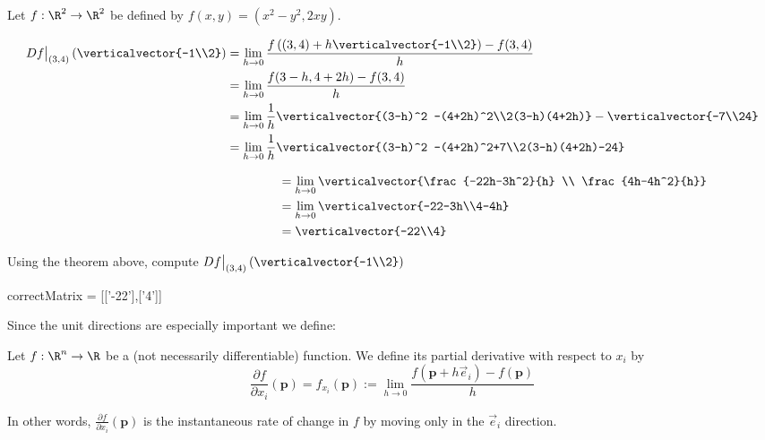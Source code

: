 \documentclass{ximera}
\begin{document}
	\begin{question}
		Let $f:\R^2 \to \R^2$ be defined by $f(x,y)=(x^2-y^2,2xy)$.
			\begin{solution}
				\begin{hint}
					\begin{align*}
						  Df\big|_{(3,4)}\left(\verticalvector{-1\\2}\right) &= \lim_{h \to 0} \frac{f\left((3,4)+h\verticalvector{-1\\2}\right) - f(3,4)}{h}\\
						  &= \lim_{h \to 0} \frac{f(3-h,4+2h)-f(3,4)}{h}\\
						  &= \lim_{h \to 0}\frac{1}{h}  \verticalvector{(3-h)^2 -(4+2h)^2\\2(3-h)(4+2h)} - \verticalvector{-7\\24} \\
						  &=\lim_{h \to 0}\frac{1}{h} \verticalvector{(3-h)^2 -(4+2h)^2+7\\2(3-h)(4+2h)-24}
					\end{align*}
				\end{hint}
				\begin{hint}
					\begin{align*}
						 \hphantom{Df\big|_{(3,4)}\left(\verticalvector{-1\\2}\right) }&=\lim_{h \to 0}\verticalvector{\frac{-22h-3h^2}{h} \\ \frac{4h-4h^2}{h}}\\
						&=\lim_{h \to 0}\verticalvector{-22-3h\\4-4h}\\
						&=\verticalvector{-22\\4}
					\end{align*}
				\end{hint}
				Using the theorem above, compute $Df\big|_{(3,4)}\left(\verticalvector{-1\\2}\right)$
				\begin{matrix-answer}
					correctMatrix = [['-22'],['4']]
				\end{matrix-answer}
			\end{solution}
	\end{question}

	Since the unit directions are especially important we define:
	
	\begin{definition}
		Let $f: \R^n \to \R$ be a (not necessarily differentiable) function.  We define its partial derivative with respect to $x_i$ by
		\[
			\frac{\partial f}{\partial x_i} (\mathbf{p}) = f_{x_i}(\mathbf{p}) := \displaystyle\lim_{h \to 0} \frac{f(\mathbf{p}+h\vec{e}_i)-f(\mathbf{p})}{h}
		\]
		
		In other words, $\frac{\partial f}{\partial x_i} (\mathbf{p})$ is the instantaneous rate of change in $f$ by moving only in the $\vec{e}_i$ direction.
	\end{definition}	
	
\end{document}
